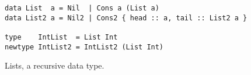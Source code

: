 \begin{verbatim}
data List  a = Nil  | Cons a (List a)
data List2 a = Nil2 | Cons2 { head :: a, tail :: List2 a }

type    IntList  = List Int
newtype IntList2 = IntList2 (List Int)
\end{verbatim}
\caption{Lists, a recursive data type.}
